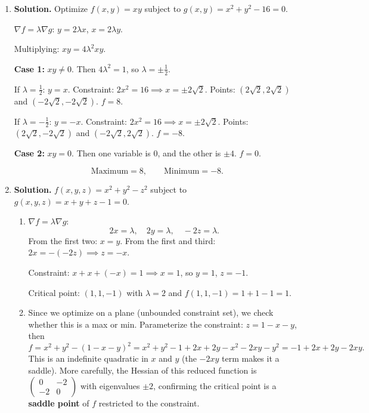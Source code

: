 \begin{enumerate}
\item \textbf{Solution.}
Optimize $f(x,y) = xy$ subject to $g(x,y) = x^2 + y^2 - 16 = 0$.

$\nabla f = \lambda \nabla g$: $y = 2\lambda x$, $x = 2\lambda y$.

Multiplying: $xy = 4\lambda^2 xy$.

\textbf{Case 1:} $xy \neq 0$. Then $4\lambda^2 = 1$, so $\lambda = \pm\frac{1}{2}$.

If $\lambda = \frac{1}{2}$: $y = x$. Constraint: $2x^2 = 16 \implies x = \pm 2\sqrt{2}$. Points: $(2\sqrt{2}, 2\sqrt{2})$ and $(-2\sqrt{2}, -2\sqrt{2})$. $f = 8$.

If $\lambda = -\frac{1}{2}$: $y = -x$. Constraint: $2x^2 = 16 \implies x = \pm 2\sqrt{2}$. Points: $(2\sqrt{2}, -2\sqrt{2})$ and $(-2\sqrt{2}, 2\sqrt{2})$. $f = -8$.

\textbf{Case 2:} $xy = 0$. Then one variable is 0, and the other is $\pm 4$. $f = 0$.

\[
\boxed{\text{Maximum} = 8, \qquad \text{Minimum} = -8.}
\]

\item \textbf{Solution.}
$f(x,y,z) = x^2 + y^2 - z^2$ subject to $g(x,y,z) = x + y + z - 1 = 0$.

\begin{enumerate}
    \item $\nabla f = \lambda \nabla g$:
    \[
    2x = \lambda, \quad 2y = \lambda, \quad -2z = \lambda.
    \]
    From the first two: $x = y$. From the first and third: $2x = -(-2z) \implies z = -x$.

    Constraint: $x + x + (-x) = 1 \implies x = 1$, so $y = 1$, $z = -1$.

    Critical point: $\boxed{(1, 1, -1)}$ with $\lambda = 2$ and $f(1,1,-1) = 1 + 1 - 1 = 1$.

    \item Since we optimize on a plane (unbounded constraint set), we check whether this is a max or min. Parameterize the constraint: $z = 1 - x - y$, then
    \[
    f = x^2 + y^2 - (1-x-y)^2 = x^2 + y^2 - 1 + 2x + 2y - x^2 - 2xy - y^2 = -1 + 2x + 2y - 2xy.
    \]
    This is an indefinite quadratic in $x$ and $y$ (the $-2xy$ term makes it a saddle). More carefully, the Hessian of this reduced function is $\begin{pmatrix} 0 & -2 \\ -2 & 0 \end{pmatrix}$ with eigenvalues $\pm 2$, confirming the critical point is a \textbf{saddle point} of $f$ restricted to the constraint.


\end{enumerate}
\end{enumerate}
